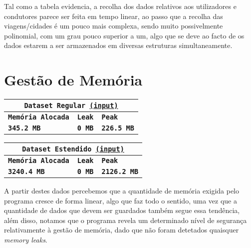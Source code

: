\documentclass[12pt,a4paper]{report}
\begin{document}
\vspace{10pt}

Tal como a tabela evidencia, a recolha dos dados relativos aos utilizadores e condutores parece ser feita em tempo linear, ao passo que a recolha das viagens/cidades é um pouco mais complexa, sendo muito possivelmente polinomial, com um grau pouco superior a um, algo que se deve ao facto de os dados estarem a ser armazenados em diversas estruturas simultaneamente. 


\section{Gestão de Memória}

{
\setlength\arrayrulewidth{1pt}

\begin{center}
    \begin{tabular}{ |p{4.73cm}|p{4.73cm}|p{4.73cm}|  }
        \hline
        \multicolumn{3}{|c|}{\textbf{\texttt{Dataset Regular \href{https://li3.di.uminho.pt/test/161/input}{(input)}}}} \\
        \hline
        \centering\textbf{\texttt{Memória Alocada}} & \hfil \textbf{\texttt{Leak}} & \hfil \textbf{\texttt{Peak}} \\
        \hline
        \centering\textbf{\texttt{345.2 MB}} & \hfil \texttt{\textbf{0 MB}} & \hfil \texttt{\textbf{226.5 MB}}\\
        \hline
    \end{tabular}
\end{center}


\begin{center}
    \begin{tabular}{ |p{4.73cm}|p{4.73cm}|p{4.73cm}|  }
        \hline
        \multicolumn{3}{|c|}{\textbf{\texttt{Dataset Estendido \href{https://li3.di.uminho.pt/test/161/input}{(input)}}}} \\
        \hline
        \centering\textbf{\texttt{Memória Alocada}} & \hfil \textbf{\texttt{Leak}} & \hfil \textbf{\texttt{Peak}} \\
        \hline
        \centering\textbf{\texttt{3240.4 MB}} & \hfil \texttt{\textbf{0 MB}} & \hfil \texttt{\textbf{2126.2 MB}}\\
        \hline
    \end{tabular}
\end{center}
}

\vspace{10pt}

A partir destes dados percebemos que a quantidade de memória exigida pelo programa cresce de forma linear, algo que faz todo o sentido, uma vez que a quantidade de dados que devem ser guardados também segue essa tendência, além disso, notamos que o programa revela um determinado nível de segurança relativamente à gestão de memória, dado que não foram detetados quaisquer \textit{memory leaks}.  
\end{document}
